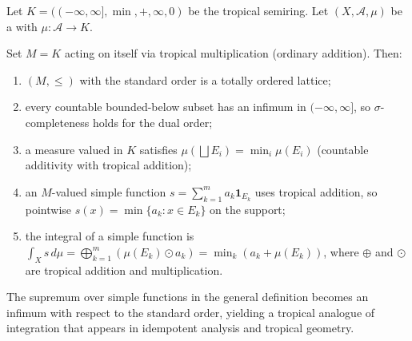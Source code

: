 \begin{definition} \label{definition:tropical_min_plus_integration_as_special_case}
Let $K = ((-\infty,\infty], \min, +, \infty, 0)$ be the tropical semiring. Let $(X,\mathcal{A},\mu)$ be a  with $\mu : \mathcal{A} \to K$.

Set $M = K$ acting on itself via tropical multiplication (ordinary addition). Then:
\begin{enumerate}
    \item $(M, \leq)$ with the standard order is a totally ordered lattice;
    \item every countable bounded-below subset has an infimum in $(-\infty,\infty]$, so $\sigma$-completeness holds for the dual order;
    \item a measure valued in $K$ satisfies $\mu(\bigsqcup E_i) = \min_i \mu(E_i)$ (countable additivity with tropical addition);
    \item an $M$-valued simple function $s = \sum_{k=1}^m a_k \mathbf{1}_{E_k}$ uses tropical addition, so pointwise $s(x) = \min\{a_k : x \in E_k\}$ on the support;
    \item the integral of a simple function is $\int_X s\,d\mu = \bigoplus_{k=1}^m (\mu(E_k) \odot a_k) = \min_{k} (a_k + \mu(E_k))$, where $\oplus$ and $\odot$ are tropical addition and multiplication.
\end{enumerate}

The supremum over simple functions in the general definition becomes an infimum with respect to the standard order, yielding a tropical analogue of integration that appears in idempotent analysis and tropical geometry.
\end{definition}
